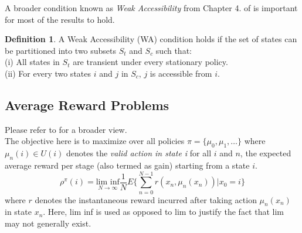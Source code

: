 \documentclass{article}
\theoremstyle{definition}
\newtheorem{definition}{Definition}[section]
\begin{document}
A broader condition known as \textit{Weak Accessibility} from Chapter 4. of \cite{dp1} is important for most of the results to hold.
\begin{definition}
A Weak Accessibility (WA) condition holds if the set of states can be partitioned into two subsets $S_t$ and $S_c$ such that:\\
(i) All states in $S_t$ are transient under every stationary policy.\\
(ii) For every two states $i$ and $j$ in $S_c$, $j$ is accessible from $i$.
\end{definition}


\subsection{Average Reward Problems}
Please refer to \cite{dp2,survey,Mahadevan2005AverageRR} for a broader view.\\
The objective here is to maximize over all policies $\pi=\{\mu_0,\mu_1,\dotsc\}$ where $\mu_n(i)\in U(i)$ denotes the \textit{valid action in state i} for all $i$ and $n$, the expected average reward per stage (also termed as gain) starting from a state $i$.
\begin{equation}
    \label{eqn:def}
    \rho^{\pi}(i)=\underset{N\rightarrow\infty}{\text{lim inf}}\dfrac{1}{N}E\Big\{\sum_{n=0}^{N-1}r(x_n,\mu_n(x_n))|x_0=i\Big\}
\end{equation}
where $r$ denotes the instantaneous reward incurred after taking action $\mu_n(x_n)$ in state $x_n$. Here, lim inf is used as opposed to lim to justify the fact that lim may not generally exist.\\
\end{document}
